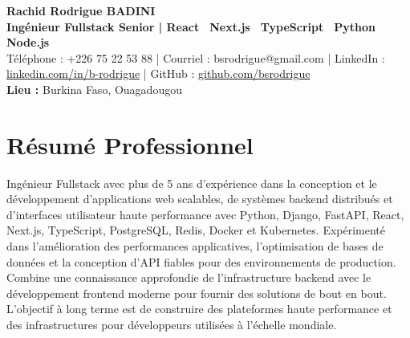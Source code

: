\documentclass[a4paper,10pt]{article}
\begin{document}
    {\LARGE\bfseries Rachid Rodrigue BADINI} \\[0.15cm]
    \textbf{Ingénieur Fullstack Senior | React \textbullet\, Next.js \textbullet\, TypeScript \textbullet\, Python \textbullet\, Node.js} \\
    {\footnotesize Téléphone : +226 75 22 53 88 | Courriel : bsrodrigue@gmail.com | LinkedIn : \href{https://linkedin.com/in/b-rodrigue}{linkedin.com/in/b-rodrigue} | GitHub : \href{https://github.com/bsrodrigue}{github.com/bsrodrigue} \\
    \textbf{Lieu :} Burkina Faso, Ouagadougou}

\vspace{0.1cm}

\section*{Résumé Professionnel}
Ingénieur Fullstack avec plus de 5 ans d'expérience dans la conception et le développement d'applications web scalables, de systèmes backend distribués et d'interfaces utilisateur haute performance avec Python, Django, FastAPI, React, Next.js, TypeScript, PostgreSQL, Redis, Docker et Kubernetes. Expérimenté dans l'amélioration des performances applicatives, l'optimisation de bases de données et la conception d'API fiables pour des environnements de production. Combine une connaissance approfondie de l'infrastructure backend avec le développement frontend moderne pour fournir des solutions de bout en bout. L'objectif à long terme est de construire des plateformes haute performance et des infrastructures pour développeurs utilisées à l'échelle mondiale.

\end{document}
